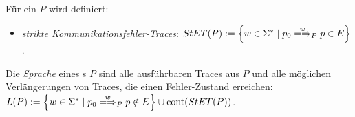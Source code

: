 \begin{Def}
  \label{strikteKommTracesDef}
  Für ein \MEIO{} $P$ wird definiert:
  \begin{itemize}
    \item \emph{strikte Kommunikationsfehler-Traces}: $\StET (P) :=
      \left\{w\in\Sigma ^* \mid p_0 \weakmay[w]_P p \in E\right\}$.
  \end{itemize}
\end{Def}

\begin{Def}[Sprache]
  \label{LDef}
  Die \emph{Sprache} eines \MEIO{}s $P$ sind alle ausführbaren Traces aus $P$
  und alle möglichen Verlängerungen von Traces, die einen Fehler-Zustand
  erreichen: $L(P) := \left\{w\in \Sigma ^* \mid
  p_0\weakmay[w]_P p\notin E\right\} \cup \cont (\StET (P))$.
\end{Def}
